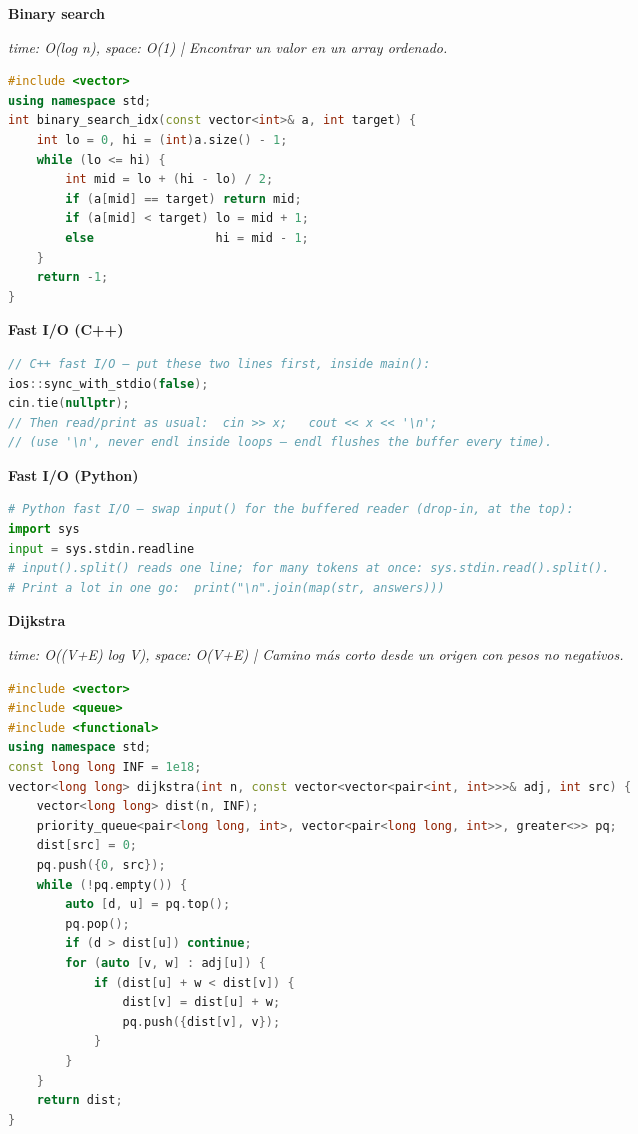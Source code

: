 \documentclass[8pt,a4paper,landscape]{extarticle}
\makeatletter
\newcommand{\csalgo}[1]{%
  \vspace{0.8ex}%
  {\bfseries\small #1}\par
  \vspace{0.4ex}{\color{cs@rule}\hrule height 0.4pt}\vspace{0.5ex}%
}
\newcommand{\csstats}[1]{{\scriptsize\itshape #1\par\vspace{0.3ex}}}
\makeatother
\begin{document}
\begin{multicols}{3}
\csalgo{Binary search}
\csstats{time: O(log n), space: O(1)  |  Encontrar un valor en un array ordenado.}
\begin{lstlisting}[language=C++]
#include <vector>
using namespace std;
int binary_search_idx(const vector<int>& a, int target) {
    int lo = 0, hi = (int)a.size() - 1;
    while (lo <= hi) {
        int mid = lo + (hi - lo) / 2;
        if (a[mid] == target) return mid;
        if (a[mid] < target) lo = mid + 1;
        else                 hi = mid - 1;
    }
    return -1;
}
\end{lstlisting}

\csalgo{Fast I/O (C++)}
\begin{lstlisting}[language=C++]
// C++ fast I/O — put these two lines first, inside main():
ios::sync_with_stdio(false);
cin.tie(nullptr);
// Then read/print as usual:  cin >> x;   cout << x << '\n';
// (use '\n', never endl inside loops — endl flushes the buffer every time).
\end{lstlisting}

\csalgo{Fast I/O (Python)}
\begin{lstlisting}[language=Python]
# Python fast I/O — swap input() for the buffered reader (drop-in, at the top):
import sys
input = sys.stdin.readline
# input().split() reads one line; for many tokens at once: sys.stdin.read().split().
# Print a lot in one go:  print("\n".join(map(str, answers)))
\end{lstlisting}

\csalgo{Dijkstra}
\csstats{time: O((V+E) log V), space: O(V+E)  |  Camino más corto desde un origen con pesos no negativos.}
\begin{lstlisting}[language=C++]
#include <vector>
#include <queue>
#include <functional>
using namespace std;
const long long INF = 1e18;
vector<long long> dijkstra(int n, const vector<vector<pair<int, int>>>& adj, int src) {
    vector<long long> dist(n, INF);
    priority_queue<pair<long long, int>, vector<pair<long long, int>>, greater<>> pq;
    dist[src] = 0;
    pq.push({0, src});
    while (!pq.empty()) {
        auto [d, u] = pq.top();
        pq.pop();
        if (d > dist[u]) continue;
        for (auto [v, w] : adj[u]) {
            if (dist[u] + w < dist[v]) {
                dist[v] = dist[u] + w;
                pq.push({dist[v], v});
            }
        }
    }
    return dist;
}
\end{lstlisting}


\end{multicols}
\end{document}
